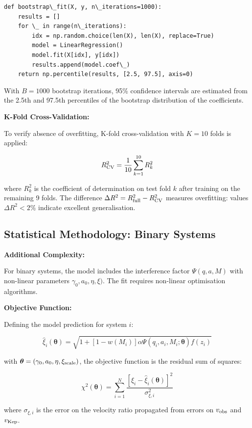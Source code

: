 \documentclass[11pt,a4paper]{article}
\begin{document}
\begin{lstlisting}
def bootstrap\_fit(X, y, n\_iterations=1000):
    results = []
    for \_ in range(n\_iterations):
        idx = np.random.choice(len(X), len(X), replace=True)
        model = LinearRegression()
        model.fit(X[idx], y[idx])
        results.append(model.coef\_)
    return np.percentile(results, [2.5, 97.5], axis=0)
\end{lstlisting}

With \(B = 1000\) bootstrap iterations, 95\% confidence intervals are
estimated from the 2.5th and 97.5th percentiles of the bootstrap
distribution of the coefficients.

\textbf{K-Fold Cross-Validation:}

To verify absence of overfitting, K-fold cross-validation with
\(K = 10\) folds is applied:

\[R^2_{\rm CV} = \frac{1}{10}\sum_{k=1}^{10} R^2_k\]

where \(R^2_k\) is the coefficient of determination on test fold \(k\)
after training on the remaining 9 folds. The difference
\(\Delta R^2 = R^2_{\rm full} - R^2_{\rm CV}\) measures overfitting:
values \(\Delta R^2 < 2\%\) indicate excellent generalisation.

\hypertarget{statistical-methodology-binary-systems}{%
\subsection{Statistical Methodology: Binary
Systems}\label{statistical-methodology-binary-systems}}

\textbf{Additional Complexity:}

For binary systems, the model includes the interference factor
\(\Psi(q,a,M)\) with non-linear parameters
\(\gamma_0, a_0, \eta, \xi)\). The fit requires non-linear optimisation
algorithms.

\textbf{Objective Function:}

Defining the model prediction for system \(i\):

\[\hat\xi_i(\boldsymbol\theta) = \sqrt{1 + [1-w(M_i)]\alpha \Psi(q_i,a_i,M_i;\boldsymbol\theta) f(z_i)}\]

with \(\boldsymbol\theta = (\gamma_0, a_0, \eta, \xi_{\rm scale})\), the
objective function is the residual sum of squares:

\[\chi^2(\boldsymbol\theta) = \sum_{i=1}^N \frac{[\xi_i - \hat\xi_i(\boldsymbol\theta)]^2}{\sigma_{\xi,i}^2}\]

where \(\sigma_{\xi,i}\) is the error on the velocity ratio propagated
from errors on \(v_{\rm obs}\) and \(v_{\rm Kep}\).
\end{document}
